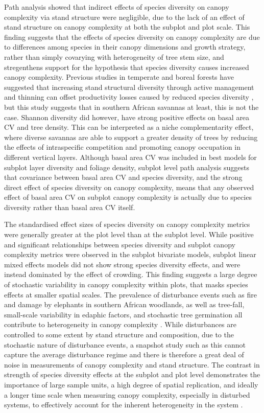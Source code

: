 \documentclass[11pt,a4paper]{article}
\begin{document}
Path analysis showed that indirect effects of species diversity on canopy complexity via stand structure were negligible, due to the lack of an effect of stand structure on canopy complexity at both the subplot and plot scale. This finding suggests that the effects of species diversity on canopy complexity are due to differences among species in their canopy dimensions and growth strategy, rather than simply covarying with heterogeneity of tree stem size, and stregenthens support for the hypothesis that species diversity causes increased canopy complexity. Previous studies in temperate and boreal forests have suggested that increasing stand structural diversity through active management and thinning can offset productivity losses caused by reduced species diversity \citep{Levick2009}, but this study suggests that in southern African savannas at least, this is not the case. Shannon diversity did however, have strong positive effects on basal area CV and tree density. This can be interpreted as a niche complementarity effect, where diverse savannas are able to support a greater density of trees by reducing the effects of intraspecific competition and promoting canopy occupation in different vertical layers. Although basal area CV was included in best models for subplot layer diversity and foliage density, subplot level path analysis suggests that covariance between basal area CV and species diversity, and the strong direct effect of species diversity on canopy complexity, means that any observed effect of basal area CV on subplot canopy complexity is actually due to species diversity rather than basal area CV itself. 

The standardised effect sizes of species diversity on canopy complexity metrics were generally greater at the plot level than at the subplot level. While positive and significant relationships between species diversity and subplot canopy complexity metrics were observed in the subplot bivariate models, subplot linear mixed effects models did not show strong species diversity effects, and were instead dominated by the effect of crowding. This finding suggests a large degree of stochastic variability in canopy complexity within plots, that masks species effects at smaller spatial scales. The prevalence of disturbance events such as fire and damage by elephants in southern African woodlands, as well as tree-fall, small-scale variability in edaphic factors, and stochastic tree germination all contribute to heterogeneity in canopy complexity \citep{}. While disturbances are controlled to some extent by stand structure and composition, due to the stochastic nature of disturbance events, a snapshot study such as this cannot capture the average disturbance regime and there is therefore a great deal of noise in measurements of canopy complexity and stand structure. The contrast in strength of species diversity effects at the subplot and plot level demonstrates the importance of large sample units, a high degree of spatial replication, and ideally a longer time scale when measuring canopy complexity, especially in disturbed systems, to effectively account for the inherent heterogeneity in the system \citep{}. 
\end{document}
